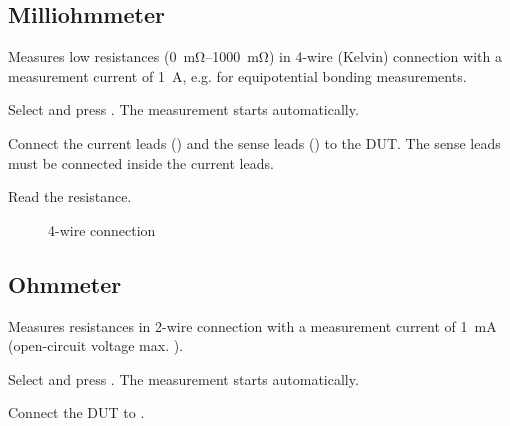 \subsection{Milliohmmeter}
\label{sec:mode_mohm}
Measures low resistances (\qtyrange{0}{1000}{\milli\ohm}) in 4-wire (Kelvin) connection with a
measurement current of \qty{1}{\ampere}, e.g. for equipotential bonding measurements.
\begin{steps}
    \item Select  and press . The measurement starts automatically.
    \item Connect the current leads () and the sense leads () to the \ac{DUT}.
          The sense leads must be connected inside the current leads.
    \item Read the resistance.
\end{steps}
\begin{figure}[h!]
    \centering
    \caption{4-wire connection}
\end{figure}

\subsection{Ohmmeter}
\label{sec:mode_ohm}
Measures resistances in 2-wire connection with a measurement current of \qty{1}{\milli\ampere}
(open-circuit voltage max. ).
\begin{steps}
    \item Select  and press . The measurement starts automatically.
    \item Connect the \ac{DUT} to .
\end{steps}

